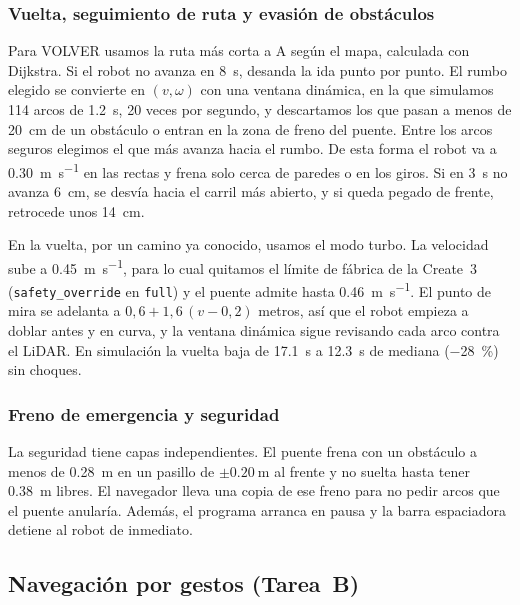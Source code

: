 \documentclass[11pt,a4paper]{article}
\begin{document}
\subsubsection{Vuelta, seguimiento de ruta y evasión de obstáculos}

Para VOLVER usamos la ruta más corta a A según el mapa, calculada con Dijkstra. Si el robot no avanza en \SI{8}{\second}, desanda la ida punto por punto. El rumbo elegido se convierte en $(v,\omega)$ con una ventana dinámica, en la que simulamos 114 arcos de \SI{1,2}{\second}, 20 veces por segundo, y descartamos los que pasan a menos de \SI{20}{\centi\meter} de un obstáculo o entran en la zona de freno del puente. Entre los arcos seguros elegimos el que más avanza hacia el rumbo. De esta forma el robot va a \SI{0,30}{\meter\per\second} en las rectas y frena solo cerca de paredes o en los giros. Si en \SI{3}{\second} no avanza \SI{6}{\centi\meter}, se desvía hacia el carril más abierto, y si queda pegado de frente, retrocede unos \SI{14}{\centi\meter}.

En la vuelta, por un camino ya conocido, usamos el modo turbo. La velocidad sube a \SI{0,45}{\meter\per\second}, para lo cual quitamos el límite de fábrica de la Create~3 (\texttt{safety\_override} en \texttt{full}) y el puente admite hasta \SI{0,46}{\meter\per\second}. El punto de mira se adelanta a $0{,}6 + 1{,}6\,(v - 0{,}2)$ metros, así que el robot empieza a doblar antes y en curva, y la ventana dinámica sigue revisando cada arco contra el LiDAR. En simulación la vuelta baja de \SI{17,1}{\second} a \SI{12,3}{\second} de mediana (\SI{-28}{\percent}) sin choques.

\subsubsection{Freno de emergencia y seguridad}

La seguridad tiene capas independientes. El puente frena con un obstáculo a menos de \SI{0,28}{\meter} en un pasillo de $\pm\SI{0,20}{\meter}$ al frente y no suelta hasta tener \SI{0,38}{\meter} libres. El navegador lleva una copia de ese freno para no pedir arcos que el puente anularía. Además, el programa arranca en pausa y la barra espaciadora detiene al robot de inmediato.

\subsection{Navegación por gestos (Tarea~B)}
\end{document}
